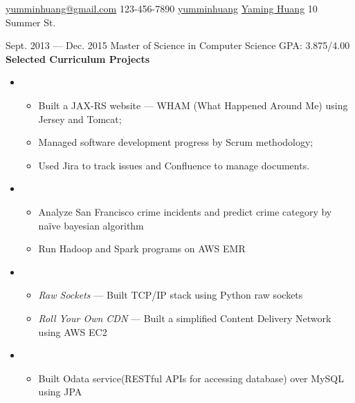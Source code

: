 \documentclass{newresume}
\begin{document}
{\href{mailto:yumminhuang@gmail.com}{yumminhuang@gmail.com}}
{123-456-7890}
{\href{https://github.com/yumminhuang}{yumminhuang}}
{\href{https://www.linkedin.com/in/yaming-huang-6a09325b}{Yaming Huang}}
{10 Summer St.}


\begin{body}
	{Sept. 2013 --- Dec. 2015}
	{Master of Science in Computer Science}
	{GPA: 3.875/4.00}
	\textbf{Selected Curriculum Projects}
	\begin{itemize}
	\item {}
	\begin{itemize}
		\item Built a JAX-RS website --- WHAM (What Happened Around Me) using Jersey and Tomcat;
		\item Managed software development progress by Scrum methodology;
		\item Used Jira to track issues and Confluence to manage documents.
	\end{itemize}

	\item {}
	\begin{itemize}
		\item Analyze San Francisco crime incidents and predict crime category by na\"{i}ve bayesian algorithm
		\item Run Hadoop and Spark programs on AWS EMR
	\end{itemize}

	\item {}
	\begin{itemize}
		\item \textit{Raw Sockets} --- Built TCP/IP stack using Python raw sockets
		\item \textit{Roll Your Own CDN} --- Built a simplified Content Delivery Network using AWS EC2
	\end{itemize}

	\item {}
	\begin{itemize}
		\item Built Odata service(RESTful APIs for accessing database) over MySQL using JPA
	\end{itemize}

	\end{itemize}
\end{body}
\end{document}
